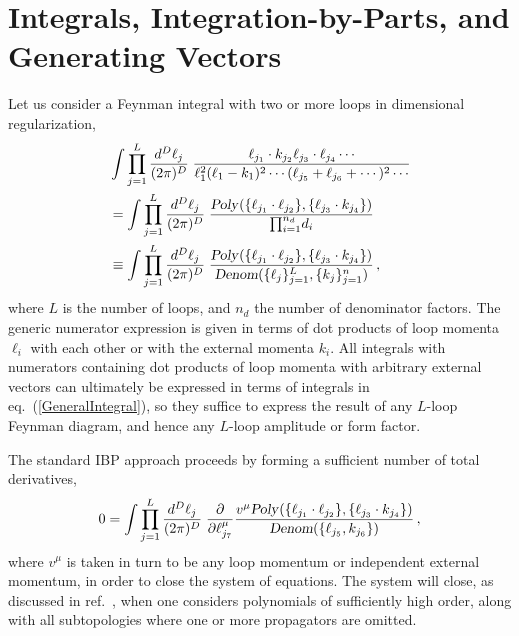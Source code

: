 \documentclass[aps,prd,preprint,groupedaddress,nofootinbib,showpacs,eqsecnum]{revtex4}
\def\eqn#1{eq.~(\ref{#1})}
\begin{document}
\section{Integrals, Integration-by-Parts, and Generating Vectors}
\label{IBPReviewSection}

\def\Poly{\textsl{Poly\/}}
\def\Denom{\textsl{Denom\/}}
Let us consider a Feynman
integral with two or more loops in dimensional regularization,
\begin{equation}
\begin{aligned}
&\int \prod_{j=1}^L \frac{d^D\ell_j}{(2\pi)^D}\; 
    \frac{\ell_{j_1}\cdot k_{j_2} \ell_{j_3}\cdot \ell_{j_4}\cdots}
         {\ell_1^2 (\ell_1-k_1)^2 \cdots (\ell_{j_5}+\ell_{j_6}+\cdots)^2\cdots}
\\ &= \int \prod_{j=1}^L \frac{d^D\ell_j}{(2\pi)^D}\; 
     \frac{\Poly(\{\ell_{j_1}\cdot\ell_{j_2}\},\{\ell_{j_3}\cdot k_{j_4}\})}
          {\textstyle{\prod_{i=1}^{n_d}} d_i}
\\ &\equiv \int \prod_{j=1}^L \frac{d^D\ell_j}{(2\pi)^D}\; 
     \frac{\Poly(\{\ell_{j_1}\cdot\ell_{j_2}\},\{\ell_{j_3}\cdot k_{j_4}\})}
          {\Denom(\{\ell_{j}\}_{j=1}^L,\{k_{j}\}_{j=1}^n)}\,,
\end{aligned}
\label{GeneralIntegral}
\end{equation}
where $L$ is the number of loops, and $n_d$ the number of denominator
factors.
The generic numerator expression is given in terms of dot products of
loop momenta $\ell_i$ with each other or with the external momenta $k_i$.
All integrals
with numerators containing
dot products of loop momenta with arbitrary external vectors
can ultimately be expressed in terms of integrals in \eqn{GeneralIntegral},
so they suffice to express the result of any $L$-loop Feynman diagram, and
hence any $L$-loop amplitude or form factor.

The standard IBP approach proceeds by forming a sufficient number of total
derivatives,
\begin{equation}
0 = \int \prod_{j=1}^L \frac{d^D\ell_j}{(2\pi)^D}\; 
\frac{\partial}{\partial\ell_{j_7}^\mu}
\frac{v^\mu\Poly(\{\ell_{j_1}\cdot\ell_{j_2}\},\{\ell_{j_3}\cdot k_{j_4}\})}
{\Denom(\{\ell_{j_5},k_{j_6}\})}\,,
\end{equation}
where $v^\mu$ is taken in turn to be any loop momentum or independent
external momentum, in order to close the system of equations.  The system will
close, as discussed in ref.~\cite{Laporta}, when one considers polynomials
of sufficiently high order, along with all subtopologies where one or
more propagators are omitted.
\end{document}
